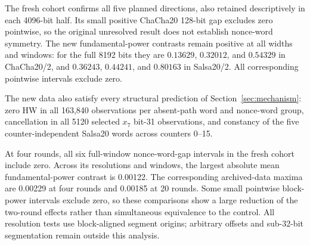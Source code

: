 The fresh cohort confirms all five planned directions, also retained descriptively in each 4096-bit half. Its small positive ChaCha20 128-bit gap excludes zero pointwise, so the original unresolved result does not establish nonce-word symmetry. The new fundamental-power contrasts remain positive at all widths and windows: for the full 8192 bits they are $0.13629$, $0.32012$, and $0.54329$ in ChaCha20/2, and $0.36243$, $0.44241$, and $0.80163$ in Salsa20/2. All corresponding pointwise intervals exclude zero.

The new data also satisfy every structural prediction of Section~\ref{sec:mechanism}: zero HW in all 163,840 observations per absent-path word and nonce-word group, cancellation in all 5120 selected $x_7$ bit-31 observations, and constancy of the five counter-independent Salsa20 words across counters 0--15.

At four rounds, all six full-window nonce-word-gap intervals in the fresh cohort include zero. Across its resolutions and windows, the largest absolute mean fundamental-power contrast is 0.00122. The corresponding archived-data maxima are 0.00229 at four rounds and 0.00185 at 20 rounds. Some small pointwise block-power intervals exclude zero, so these comparisons show a large reduction of the two-round effects rather than simultaneous equivalence to the control. All resolution tests use block-aligned segment origins; arbitrary offsets and sub-32-bit segmentation remain outside this analysis.
